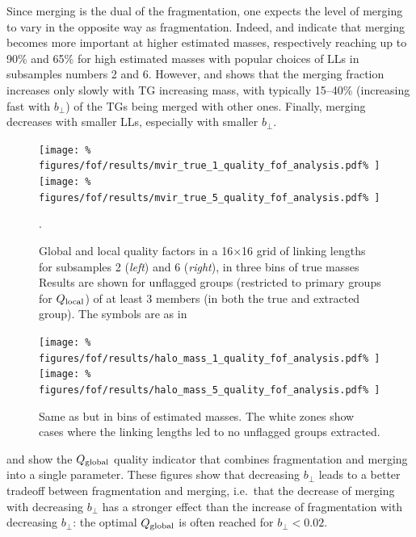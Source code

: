 Since merging is the dual of the fragmentation, one expects the level of
merging to vary  in the opposite way as fragmentation. Indeed,
 and 
indicate that merging becomes more important at higher estimated masses,
respectively reaching up to 90\% and 65\% for high estimated masses with
popular choices of LLs in subsamples numbers 2 and 6. However,
 and  shows that
the merging fraction increases only slowly with TG increasing mass, with
typically 15--40\% (increasing fast with $b_\perp$) of the TGs being merged with
other ones. Finally, merging decreases with smaller LLs, especially with
smaller $b_\perp$.
%
\begin{figure}
    \centering
    \texttt{[image: \%
        figures/fof/results/mvir\_true\_1\_quality\_fof\_analysis.pdf\%
    ]}
    \texttt{[image: \%
        figures/fof/results/mvir\_true\_5\_quality\_fof\_analysis.pdf\%
    ]}
    \caption{Global and local quality factors in a 16$\times$16 grid of linking
        lengths for subsamples 2 (\emph{left}) and 6 (\emph{right}), in three
        bins of true masses Results are shown for unflagged groups (restricted
        to primary groups for $Q_{\rm local}$) of at least 3 members (in both
    the true and extracted group). The symbols are as in
\label{fig:quality_true}}.
\end{figure}
%
\begin{figure}
    \centering
    \texttt{[image: \%
        figures/fof/results/halo\_mass\_1\_quality\_fof\_analysis.pdf\%
    ]}
    \texttt{[image: \%
        figures/fof/results/halo\_mass\_5\_quality\_fof\_analysis.pdf\%
    ]}
    \caption{Same as  but in bins of estimated
    masses. The white zones show cases where the linking lengths led to no
unflagged groups extracted.\label{fig:quality_estimated}}
\end{figure}

 and  show the
$Q_{\rm global}$ quality indicator that combines fragmentation and merging into
a single parameter. These figures show that decreasing $b_\perp$ leads to a
better tradeoff between fragmentation and merging, i.e.\ that the decrease of
merging with decreasing $b_\perp$ has a stronger effect than the increase of
fragmentation with decreasing $b_\perp$: the optimal $Q_{\rm global}$ is often
reached for $b_\perp < 0.02$.

